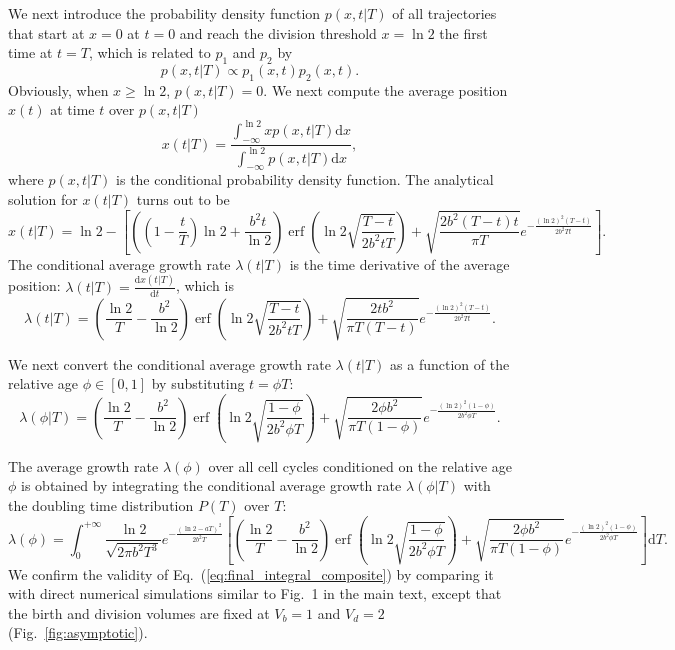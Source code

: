 \documentclass[aps, prl, longbibliography, linenumbers, superscriptaddress]{revtex4-2}
\begin{document}
We next introduce the probability density function $p(x, t|T)$ of all trajectories that start at $x=0$ at $t=0$ and reach the division threshold $x=\ln 2$ the first time at $t=T$, which is related to $p_1$ and $p_2$ by
\begin{equation}
	p(x, t|T) \propto p_1 (x, t) p_2 (x, t).
	\label{eq:conditional_density}
\end{equation}
Obviously, when $x \ge \ln 2$, $p(x, t|T) = 0$. We next compute the average position $x(t)$ at time $t$ over $p(x, t|T)$
\begin{equation}
	x(t|T) = \frac{\int_{-\infty}^{\ln 2} x p(x, t|T) \mathrm{d}x}{\int_{-\infty}^{\ln 2} p(x, t|T) \mathrm{d}x},
	\label{eq:x_avg_def}
\end{equation}
where $p(x, t|T)$ is the conditional probability density function. The analytical solution for $x(t|T)$ turns out to be
\begin{equation}
	x(t|T) = \ln 2 - \left[ \left( (1-\frac{t}{T})\ln 2 + \frac{b^2 t}{\ln 2} \right) \operatorname{erf}\left( \ln 2\sqrt{\frac{T-t}{2b^2 tT}} \right) + \sqrt{\frac{2b^2 (T-t)t}{\pi T}} e^{-\frac{(\ln 2)^2 (T-t)}{2b^2 Tt}} \right].
	\label{eq:x_avg_sol}
\end{equation}
The conditional average growth rate $\lambda(t|T)$ is the time derivative of the average position: $\lambda(t|T) = \frac{\mathrm{d}x(t|T)}{\mathrm{d}t}$, which is 
\begin{equation}
	\lambda(t|T) = \left( \frac{\ln 2}{T} - \frac{b^2}{\ln 2} \right) \operatorname{erf}\left( \ln 2\sqrt{\frac{T-t}{2b^2 tT}} \right) + \sqrt{\frac{2t b^2}{\pi T(T-t)}} e^{-\frac{(\ln 2)^2 (T-t)}{2b^2 Tt}}.
	\label{eq:x_prime_sol}
\end{equation}

We next convert the conditional average growth rate $\lambda(t|T)$ as a function of the relative age $\phi \in [0, 1]$ by substituting $t = \phi T$:
\begin{equation}
\lambda(\phi | T) = \left( \frac{\ln 2}{T} - \frac{b^2}{\ln 2} \right) \operatorname{erf}\left( \ln 2 \sqrt{\frac{1-\phi}{2b^2 \phi T}} \right) + \sqrt{\frac{2\phi b^2}{\pi T(1-\phi)}} e^{-\frac{(\ln 2)^2 (1-\phi)}{2b^2 \phi T}}.
\label{eq:conditional_rate}
\end{equation}

The average growth rate $\lambda(\phi)$ over all cell cycles conditioned on the relative age $\phi$ is obtained by integrating the conditional average growth rate $\lambda(\phi | T)$ with the doubling time distribution $P(T)$ over $T$:
\begin{equation}
\lambda(\phi) = \int_0^{+\infty} \frac{\ln 2}{\sqrt{2\pi b^2 T^3}} e^{-\frac{(\ln 2 - aT)^2}{2b^2 T}} \left[ \left( \frac{\ln 2}{T} - \frac{b^2}{\ln 2} \right) \operatorname{erf}\left( \ln 2\sqrt{\frac{1-\phi}{2b^2 \phi T}} \right) + \sqrt{\frac{2\phi b^2}{\pi T(1-\phi)}} e^{-\frac{(\ln 2)^2 (1-\phi)}{2b^2 \phi T}} \right] \mathrm{d}T.
\label{eq:final_integral_composite}
\end{equation}
We confirm the validity of Eq.~(\ref{eq:final_integral_composite}) by comparing it with direct numerical simulations similar to Fig.~1 in the main text, except that the birth and division volumes are fixed at $V_b=1$ and $V_d=2$ (Fig.~\ref{fig:asymptotic}).
\end{document}
